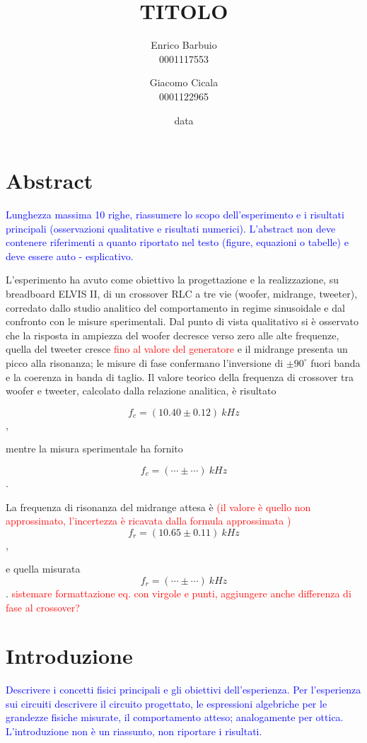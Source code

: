 \documentclass[12pt,italian]{article}
\title{TITOLO}
\author{Enrico Barbuio \\ 0001117553 \and Giacomo Cicala \\ 0001122965}
\date{data}
\newcommand{\prof}[1]{\textcolor{blue}{#1}}
\newcommand{\err}[1]{\textcolor{red}{#1}}
\begin{document}
\maketitle
\section*{Abstract}
\prof{ Lunghezza massima 10 righe, riassumere lo scopo dell'esperimento e i
	risultati principali (osservazioni qualitative e risultati numerici).
	L'abstract non deve contenere riferimenti a quanto riportato nel testo
	(figure, equazioni o tabelle) e deve essere auto - esplicativo. }

L'esperimento ha avuto come obiettivo la progettazione e la realizzazione, su
breadboard ELVIS II, di un crossover RLC a tre vie (woofer, midrange, tweeter),
corredato dallo studio analitico del comportamento in regime sinusoidale e dal
confronto con le misure sperimentali. Dal punto di vista qualitativo si è
osservato che la risposta in ampiezza del woofer decresce verso zero alle alte
frequenze, quella del tweeter cresce \err{fino al valore del generatore} e il
midrange presenta un picco alla risonanza; le misure di fase confermano
l'inversione di $ \pm 90^\circ $ fuori banda e la coerenza in banda di taglio.
Il valore teorico della frequenza di crossover tra woofer e tweeter, calcolato
dalla relazione analitica, è risultato

\begin{equation*}
	f_{c} = (10.40 \pm 0.12) \ kHz
\end{equation*},

\noindent
mentre la misura sperimentale ha fornito

\begin{equation*}
	f_{c} = (\cdots \pm \cdots) \ kHz
\end{equation*}.

\noindent
La frequenza di risonanza del midrange attesa è \err{(il valore è quello non approssimato, l'incertezza è ricavata dalla formula approssimata )}
\begin{equation*}
	f_{r} = (10.65 \pm 0.11) \ kHz
\end{equation*},

\noindent
e quella misurata
\begin{equation*}
	f_{r} = (\cdots \pm \cdots) \ kHz
\end{equation*}.
\err{sistemare formattazione eq. con virgole e punti, aggiungere anche differenza di fase al crossover?}

\section*{Introduzione}
\prof{ Descrivere i concetti fisici principali e gli obiettivi dell'esperienza.
	Per l'esperienza sui circuiti descrivere il circuito progettato, le
	espressioni algebriche per le grandezze fisiche misurate, il comportamento
	atteso; analogamente per ottica. L'introduzione non è un riassunto, non
	riportare i risultati.}
\end{document}
